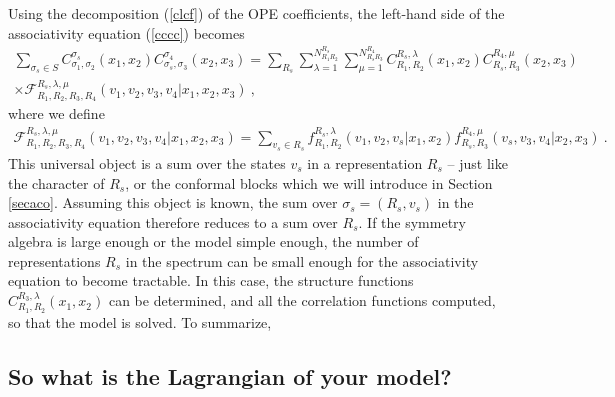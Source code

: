 \documentclass[12pt,a4paper,notitlepage]{report}
\numberwithin{equation}{section}
\theoremstyle{break}
\begin{document}
Using the decomposition (\ref{clcf}) of the OPE coefficients, 
the left-hand side of the 
associativity equation (\ref{cccc}) becomes
\begin{multline}
 \sum_{\sigma_s\in S} C_{\sigma_1,\sigma_2}^{\sigma_s}(x_1,x_2) C_{\sigma_s,\sigma_3}^{\sigma_4}(x_2,x_3) 
= \sum_{R_s}\sum_{\lambda=1}^{N_{R_1R_2}^{R_s}} \sum_{\mu=1}^{N_{R_sR_3}^{R_4}} C_{R_1,R_2}^{R_s,\lambda}(x_1,x_2) C_{R_s,R_3}^{R_4,\mu}(x_2,x_3)
\\ 
\times 
\mathcal{F}^{R_s,\lambda,\mu}_{R_1,R_2,R_3,R_4}(v_1,v_2,v_3,v_4|x_1,x_2,x_3)\ ,
\label{scce}
\end{multline}
where we define 
\begin{align}
 \mathcal{F}^{R_s,\lambda,\mu}_{R_1,R_2,R_3,R_4}(v_1,v_2,v_3,v_4|x_1,x_2,x_3) = \sum_{v_s\in R_s} f_{R_1,R_2}^{R_s,\lambda}(v_1,v_2,v_s|x_1,x_2) f_{R_s,R_3}^{R_4,\mu}(v_s,v_3,v_4|x_2,x_3) \ .
\end{align}
This universal object is a sum over the states $v_s$ in a representation $R_s$ -- just like the character of $R_s$, or the conformal blocks which we will introduce in Section \ref{secaco}.
Assuming this object is known, the sum over $\sigma_s=(R_s,v_s)$ in the associativity equation therefore reduces to a sum over $R_s$.
If the symmetry algebra is large enough or the model simple enough, the number of representations $R_s$ in the spectrum can be small enough for the associativity equation to become tractable. In this case, the structure functions $C_{R_1,R_2}^{R_3,\lambda}(x_1,x_2)$ can be determined, and all the correlation functions computed, so that the model is solved. To summarize,
\begin{center}
\end{center}


\subsection{So what is the Lagrangian of your model? \label{seclagr}}
\end{document}
